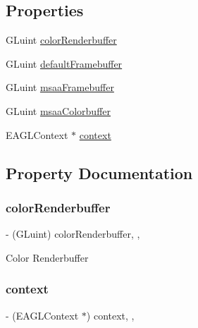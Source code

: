 \subsection*{Properties}
\begin{DoxyCompactItemize}
\item 
G\+Luint \hyperlink{interfaceCCES2Renderer_a5900ee35a8cd2dfcd91ee5dc6dc775a7}{color\+Renderbuffer}
\item 
G\+Luint \hyperlink{interfaceCCES2Renderer_a4159c6abad021130485922326db78d12}{default\+Framebuffer}
\item 
G\+Luint \hyperlink{interfaceCCES2Renderer_a5c283af5a41b77b73715279ef8ffa6ff}{msaa\+Framebuffer}
\item 
G\+Luint \hyperlink{interfaceCCES2Renderer_a85fedfac8dd06c6e2f24c33d7bc083d3}{msaa\+Colorbuffer}
\item 
E\+A\+G\+L\+Context $\ast$ \hyperlink{interfaceCCES2Renderer_a7f8ed68f47a3323d0eba368fca1e4893}{context}
\end{DoxyCompactItemize}


\subsection{Property Documentation}
\mbox{\label{interfaceCCES2Renderer_a5900ee35a8cd2dfcd91ee5dc6dc775a7}} 
\subsubsection{\texorpdfstring{color\+Renderbuffer}{colorRenderbuffer}}
{\footnotesize\ttfamily -\/ (G\+Luint) color\+Renderbuffer\hspace{0.3cm}{\ttfamily [read]}, {\ttfamily [nonatomic]}, {\ttfamily [assign]}}

Color Renderbuffer \mbox{\label{interfaceCCES2Renderer_a7f8ed68f47a3323d0eba368fca1e4893}} 
\subsubsection{\texorpdfstring{context}{context}}
{\footnotesize\ttfamily -\/ (E\+A\+G\+L\+Context $\ast$) context\hspace{0.3cm}{\ttfamily [read]}, {\ttfamily [nonatomic]}, {\ttfamily [assign]}}

